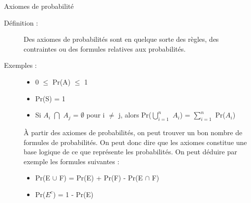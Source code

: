 \documentclass[10pt, french]{article}
\begin{document}
\begin{multicols*}{3}
\begin{axioms}{Axiomes de probabilité}
\begin{description}
  \item[Définition :] Des axiomes de probabilités sont en quelque sorte des règles, des contraintes ou des formules relatives aux probabilités.
  \item[Exemples :]
  \begin{itemize}
  \item 0 $\le$ Pr(A) $\le$ 1
  \item Pr(S) = 1
  \item Si $A_i$ $\bigcap$ $A_j$ = $\emptyset$ pour i $\neq$ j, alors Pr($\bigcup_{i = 1}^{n}$ $A_i$) = $\sum_{i = 1}^{n}$ Pr($A_i$)
  \end{itemize}
  À partir des axiomes de probabilités, on peut trouver un bon nombre de formules de probabilités. On peut donc dire que les axiomes constitue une base logique de ce que représente les probabilités. On peut déduire par exemple les formules suivantes :
  \begin{itemize}
  \item Pr(E $\cup$ F) = Pr(E) + Pr(F) - Pr(E $\cap$ F)
  \item Pr($E^{c}$) = 1 - Pr(E)
  \end{itemize}
\end{description}
\end{axioms}

\pagebreak

\end{multicols*}
\end{document}
